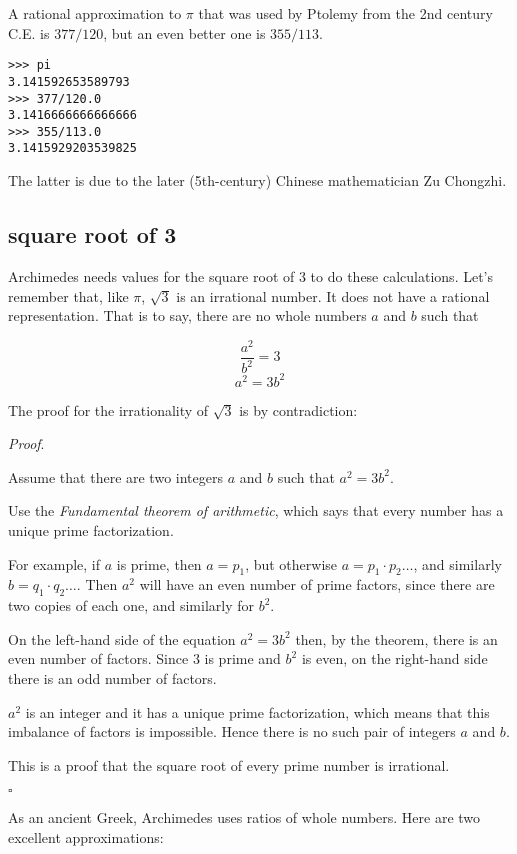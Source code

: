 \documentclass[11pt, oneside]{article}
\begin{document}
A rational approximation to $\pi$ that was used by Ptolemy from the 2nd century C.E. is $377/120$, but an even better one is $355/113$.

\begin{verbatim}
>>> pi
3.141592653589793
>>> 377/120.0
3.1416666666666666
>>> 355/113.0
3.1415929203539825
\end{verbatim}

The latter is due to the later (5th-century) Chinese mathematician Zu Chongzhi.

\subsection*{square root of 3}

Archimedes needs values for the square root of $3$ to do these calculations.  Let's remember that, like $\pi$, $\sqrt{3}$ is an irrational number.  It does not have a rational representation.  That is to say, there are no whole numbers $a$ and $b$ such that

\[ \frac{a^2}{b^2} = 3 \]
\[ a^2 = 3 b^2 \]

The proof for the irrationality of $\sqrt{3}$ is by contradiction:

\emph{Proof}.

Assume that there are two integers $a$ and $b$ such that $a^2 = 3 b^2$.  

Use the \emph{Fundamental theorem of arithmetic}, which says that every number has a unique prime factorization.  

For example, if $a$ is prime, then $a = p_1$, but otherwise $a = p_1 \cdot p_2 \dots$, and similarly $b = q_1 \cdot q_2 \dots$.  Then $a^2$ will have an even number of prime factors, since there are two copies of each one, and similarly for $b^2$.

On the left-hand side of the equation $a^2 = 3 b^2$ then, by the theorem, there is an even number of factors.  Since $3$ is prime and $b^2$ is even, on the right-hand side there is an odd number of factors.  

$a^2$ is an integer and it has a unique prime factorization, which means that this imbalance of factors is impossible.  Hence there is no such pair of integers $a$ and $b$.

This is a proof that the square root of every prime number is irrational.

$\square$

As an ancient Greek, Archimedes uses ratios of whole numbers.  Here are two excellent approximations:
\end{document}
